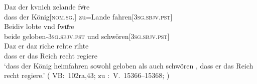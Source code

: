 \begin{exe}
\ex \label{ex:konjadjvvbeidiu}
	\begin{xlist}

	\ex \label{ex:konjadjvvbeidiu_2} %
		\gll Daz der kvnich zelande fvͦre \\
			dass der König[\textsc{nom.sg.\MascM}] zu=Lande
			fahren[\textsc{3sg\subM.sbjv.pst}] \\
	\sn \gll Beidiv lobte vnd ſwuͤre \\
			beide geloben-\textsc{3sg\subM.sbjv.pst} und
			schwören[\textsc{3sg\subM.sbjv.pst}] \\
	\sn \gll Daz er daz riche rehte rihte \\
			dass er das Reich recht regiere \\
		\trans `dass der König heimfahren  sowohl geloben als
			auch schwören , dass er das Reich recht regiere.'
			(%
				VB:~102ra,43; zu
				\KC:~V.~15366--15368;
				\cite[359]{schroeder1895}%
			)



\end{xlist}
\end{exe}
